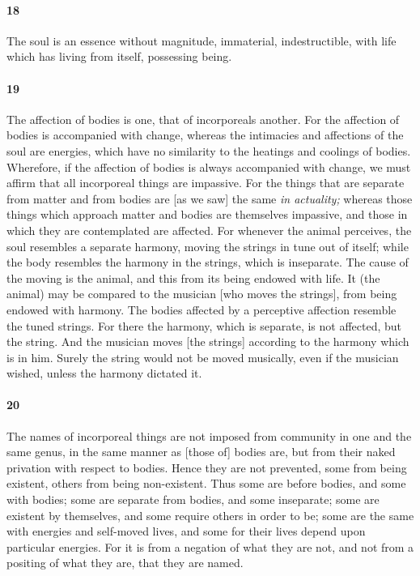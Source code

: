 \documentclass[12pt]{article}
\begin{document}
\paragraph{18} The soul is an es\-sence without magnitude, immaterial,
indestructible, with life which has living from itself, possessing being.

\paragraph{19} The affection of bodies is one, that of incorporeals another.
For the affection of bodies is accompanied with change, whereas the intimacies
and affections of the soul are energies, which have no similarity to the
heatings and coolings of bodies. Wherefore, if the affection of bodies is
always accompanied with change, we must affirm that all incorporeal things are
impassive. For the things that are separate from matter and from bodies are [as
we saw] the same \textit{in actuality;} whereas those things which approach
matter and bodies are themselves impassive, and those in which they are
contemplated are affected. For whenever the animal perceives, the soul
resembles a separate harmony, moving the strings in tune out of itself; while
the body resembles the harmony in the strings, which is inseparate. The cause
of the moving is the animal, and this from its being endowed with life. It (the
animal) may be compared to the musician [who moves the strings], from being
endowed with harmony. The bodies affected by a perceptive affection resemble
the tuned strings. For there the harmony, which is separate, is not affected,
but the string. And the musician moves [the strings] according to the harmony
which is in him. Surely the string would not be moved musically, even if the
musician wished, unless the harmony dictated it.

\paragraph{20} The names of incorporeal things are not imposed from community
in one and the same genus, in the same manner as [those of] bodies are, but
from their naked privation with respect to bodies. Hence they are not
prevented, some from being existent, others from being non-existent. Thus some
are before bodies, and some with bodies; some are separate from bodies, and
some inseparate; some are existent by themselves, and some require others in
order to be; some are the same with energies and self-moved lives, and some for
their lives depend upon particular energies. For it is from a negation of what
they are not, and not from a positing of what they are, that they are named.
\end{document}
